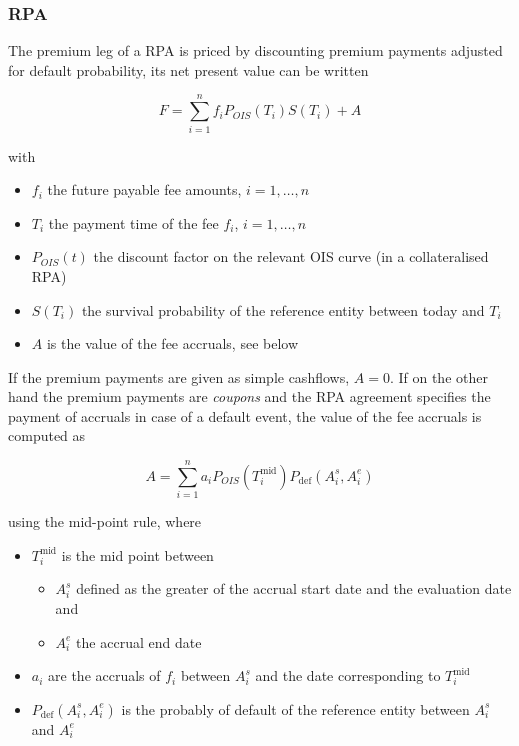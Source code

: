 \subsubsection{RPA}
\label{pricing:cr_rpa}

The premium leg of a RPA is priced by discounting premium payments adjusted for default probability, its net present
value can be written

\begin{equation}
F = \sum_{i=1}^{n} f_i P_{OIS}(T_i) S(T_i) + A
\end{equation}

with

\begin{itemize}
\item $f_i$ the future payable fee amounts, $i=1,\ldots,n$
\item $T_i$ the payment time of the fee $f_i$, $i=1,\ldots,n$
\item $P_{OIS}(t)$ the discount factor on the relevant OIS curve (in a collateralised RPA)
\item $S(T_i)$ the survival probability of the reference entity between today and $T_i$
\item $A$ is the value of the fee accruals, see below
\end{itemize}

If the premium payments are given as simple cashflows, $A=0$. If on the other hand the premium payments are {\em
  coupons} and the RPA agreement specifies the payment of accruals in case of a default event, the value of the fee
accruals is computed as

\begin{equation}
  A = \sum_{i=1}^{n} a_i P_{OIS}(T_i^{\text{mid}}) P_{\text{def}}(A^s_i,A^e_i)
\end{equation}

using the mid-point rule, where

\begin{itemize}
\item $T_i^{\text{mid}}$ is the mid point between
\begin{itemize}
\item $A^s_i$ defined as the greater of the accrual start date and the evaluation date and
\item $A^e_i$ the accrual end date
\end{itemize}
\item $a_i$ are the accruals of $f_i$ between $A^s_i$ and the date corresponding to $T_i^{\text{mid}}$
\item $P_{\text{def}}(A^s_i,A^e_i)$ is the probably of default of the reference entity between $A^s_i$ and $A^e_i$
\end{itemize}

